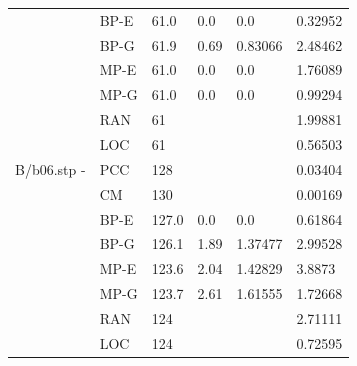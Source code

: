 \documentclass[12pt,a4paper]{article}
\begin{document}
\begin{center}
\begin{tabular}{l|l|l|l|l|l}
		&BP-E&61.0&0.0&0.0&0.32952\\
		&BP-G&61.9&0.69&0.83066&2.48462\\
		&MP-E&61.0&0.0&0.0&1.76089\\&MP-G&61.0&0.0&0.0&0.99294\\
		&RAN&61&&&1.99881\\
		&LOC&61&&&0.56503\\\hline
		B/b06.stp - &PCC&128&&&0.03404\\
		&CM&130&&&0.00169\\
		&BP-E&127.0&0.0&0.0&0.61864\\
		&BP-G&126.1&1.89&1.37477&2.99528\\
		&MP-E&123.6&2.04&1.42829&3.8873\\&MP-G&123.7&2.61&1.61555&1.72668\\
		&RAN&124&&&2.71111\\
		&LOC&124&&&0.72595\\\hline
	\end{tabular}
\end{center}
\end{document}
